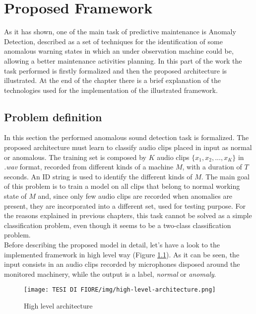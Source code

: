 \chapter{Proposed Framework}
As it has shown, one of the main task of predictive maintenance is Anomaly Detection, described as a set of techniques for the identification of some anomalous warning states in which an under observation machine could be, allowing a better maintenance activities planning. In this part of the work the task performed is firstly formalized and then the proposed architecture is illustrated. At the end of the chapter there is a brief explanation of the technologies used for the implementation of the illustrated framework.
\section{Problem definition}
In this section the performed anomalous sound detection task is formalized. The proposed architecture must learn to classify audio clips placed in input as normal or anomalous. The training set is composed by $K$ audio clips $\{x_1, x_2, ...,x_K\}$ in \textit{.wav} format, recorded from different kinds of a machine $M$, with a duration of $T$ seconds. An ID string is used to identify the different kinds of $M$. The main goal of this problem is to train a model on all clips that belong to normal working state of $M$ and, since only few audio clips are recorded when anomalies are present, they are incorporated into a different set, used for testing purpose. For the reasons explained in previous chapters, this task cannot be solved as a simple classification problem, even though it seems to be a two-class classification problem.\\
Before describing the proposed model in detail, let’s have a look to the implemented framework in high level way (Figure \ref{high-level-architecture}). As it can be seen, the input consists in an audio clips recorded by microphones disposed around the monitored machinery, while the output is a label, \textit{normal} or \textit{anomaly}.
\begin{figure}[ht]
\texttt{[image: TESI DI FIORE/img/high-level-architecture.png]}
\centering
\caption{High level architecture \cite{DCASE}}
\label{high-level-architecture}
\end{figure}


